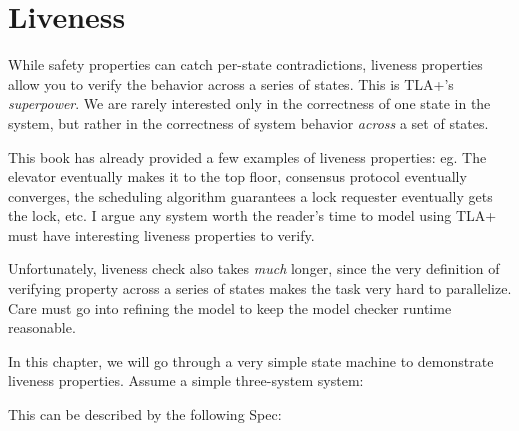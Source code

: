 % 

\chapter{Liveness}
\label{chap:liveness}

While safety properties can catch per-state contradictions, liveness properties
allow you to verify the behavior across a series of states. This is TLA+'s
\textit{superpower}. We are rarely interested only in the correctness of one
state in the system, but rather in the correctness of system behavior \textit{across} a set of states. \newline

This book has already provided a few examples of liveness properties: eg.
The elevator eventually makes it to the top floor, consensus protocol eventually
converges, the scheduling algorithm guarantees a lock requester eventually gets the
lock, etc. I argue any system worth the reader's time to model using TLA+ must 
have interesting liveness properties to verify.\newline

Unfortunately, liveness check also takes \textit{much} longer, since the very
definition of verifying property across a series of states makes the task very
hard to parallelize. Care must go into refining the model to keep the model
checker runtime reasonable.

In this chapter, we will go through a very simple state machine to demonstrate liveness properties. Assume a simple three-system system:\newline

\begin{center}
\end{center}

This can be described by the following Spec:\newline

